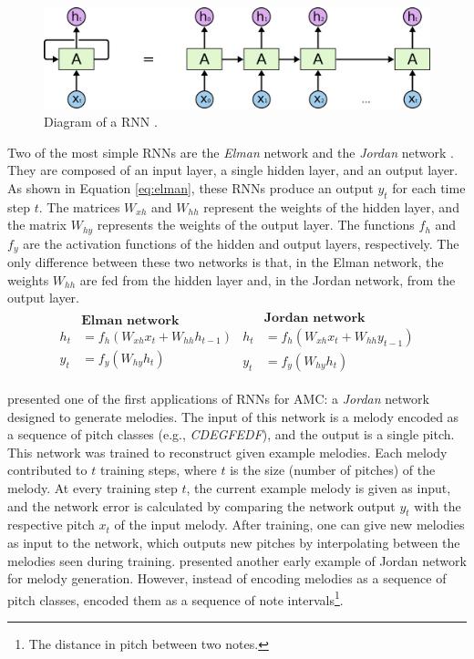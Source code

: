 \begin{figure}[!h]
\centering
\vspace{0.5cm}
\includegraphics[width=0.9\columnwidth]{imgs/background/rnn.png}
\caption{Diagram of a RNN \cite{olah2015understanding}.}
\label{fig:rnn}
\end{figure}

Two of the most simple RNNs are the \textit{Elman} network \cite{elman1990finding} and the \textit{Jordan} network \cite{jordan1986}. They are composed of an input layer, a single hidden layer, and an output layer. As shown in Equation \ref{eq:elman}, these RNNs produce an output $y_t$ for each time step $t$. The matrices $W_{xh}$ and $W_{hh}$ represent the weights of the hidden layer, and the matrix $W_{hy}$ represents the weights of the output layer. The functions $f_h$ and $f_y$ are the activation functions of the hidden and output layers, respectively. The only difference between these two networks is that, in the Elman network, the weights $W_{hh}$ are fed from the hidden layer and, in the Jordan network, from the output layer.
\begin{align}
\label{eq:elman}
\begin{split}
    &\textbf{Elman network} \\
    h_t &= f_h(W_{xh}x_t + W_{hh}h_{t-1}) \\
    y_t &= f_y(W_{hy}h_t)
\end{split}
\begin{split}
    &\textbf{Jordan network} \\
    h_t &= f_h(W_{xh}x_t + W_{hh}y_{t-1}) \\
    y_t &= f_y(W_{hy}h_t)
\end{split}
\end{align}

\citet{todd1989connectionist} presented one of the first applications of RNNs for AMC: a \textit{Jordan} network designed to generate melodies. The input of this network is a melody encoded as a sequence of pitch classes (e.g., \textit{CDEGFEDF}), and the output is a single pitch. This network was trained to reconstruct given example melodies. Each melody contributed to $t$ training steps, where $t$ is the size (number of pitches) of the melody. At every training step $t$, the current example melody is given as input, and the network error is calculated by comparing the network output $y_t$ with the respective pitch $x_t$ of the input melody. After training, one can give new melodies as input to the network, which outputs new pitches by interpolating between the melodies seen during training. \citet{duff1989backpropagation} presented another early example of Jordan network for melody generation. However, instead of encoding melodies as a sequence of pitch classes, \citet{duff1989backpropagation} encoded them as a sequence of note intervals\footnote{The distance in pitch between two notes.}.

